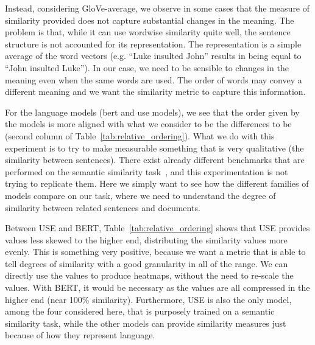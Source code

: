 Instead, considering GloVe-average, we observe in some cases that the measure of similarity provided does not capture substantial changes in the meaning. The problem is that, while it can use wordwise similarity quite well, the sentence structure is not accounted for its representation. The representation is a simple average of the word vectors (e.g. ``Luke insulted John'' results in being equal to ``John insulted Luke''). %
In our case, we need to be sensible to changes in the meaning even when the same words are used. The order of words may convey a different meaning and we want the similarity metric to capture this information.

For the language models (\acrshort{bert} and \acrshort{use} models), we see that the order given by the models is more aligned with what we consider to be the differences to be (second column of Table~\ref{tab:relative_ordering}).
What we do with this experiment is to try to make measurable something that is very qualitative (the similarity between sentences).
There exist already different benchmarks that are performed on the semantic similarity task~\citep{conneau-kiela-2018-senteval,chandrasekaran2021evolution}, and this experimentation is not trying to replicate them. Here we simply want to see how the different families of models compare on our task, where we need to understand the degree of similarity between related sentences and documents.

Between USE and BERT, Table~\ref{tab:relative_ordering} shows that USE provides values less skewed to the higher end, distributing the similarity values more evenly. 
This is something very positive, because we want a metric that is able to tell degrees of similarity with a good granularity in all of the range.
We can directly use the values to produce heatmaps, without the need to re-scale the values. With BERT, it would be necessary as the values are all compressed in the higher end (near 100\% similarity).
Furthermore, USE is also the only model, among the four considered here, that is purposely trained on a semantic similarity task, while the other models can provide similarity measures just because of how they represent language.


